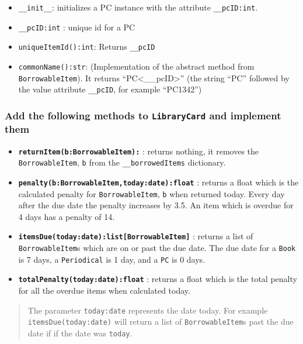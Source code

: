 \begin{itemize}
  \begin{itemize}
  \tightlist
  \item
    \texttt{\_\_init\_\_}: initializes a PC instance with the attribute
    \texttt{\_\_pcID:int}.
  \item
    \texttt{\_\_pcID:int} : unique id for a PC
  \item
    \texttt{uniqueItemId():int}: Returns \texttt{\_\_pcID}
  \item
    \texttt{commonName():str}: (Implementation of the abstract method
    from \texttt{BorrowableItem}). It returns
    ``PC\textless\_\_pcID\textgreater'' (the string ``PC'' followed by
    the value attribute \texttt{\_\_pcID}, for example ``PC1342'')
  \end{itemize}
\end{itemize}

\subsubsection{\texorpdfstring{Add the following methods to
\texttt{LibraryCard} and implement
them}{Add the following methods to LibraryCard and implement them}}\label{lab-exercise-6-borrowing-from-the-library.md__add-the-following-methods-to-librarycard-and-implement-them}

\begin{itemize}
\tightlist
\item
  \textbf{\texttt{returnItem(b:BorrowableItem):}} : returns nothing, it
  removes the \texttt{BorrowableItem}, \texttt{b} from the
  \texttt{\_\_borrowedItems} dictionary.
\item
  \textbf{\texttt{penalty(b:BorrowableItem,today:date):float}} : returns
  a float which is the calculated penalty for \texttt{BorrowableItem},
  \texttt{b} when returned today. Every day after the due date the
  penalty increases by 3.5. An item which is overdue for 4 days has a
  penalty of 14.
\item
  \textbf{\texttt{itemsDue(today:date):list{[}BorrowableItem{]}}} :
  returns a list of \texttt{BorrowableItem}s which are on or past the
  due date. The due date for a \texttt{Book} is 7 days, a
  \texttt{Periodical} is 1 day, and a \texttt{PC} is 0 days.
\item
  \textbf{\texttt{totalPenalty(today:date):float}} : returns a float
  which is the total penalty for all the overdue items when calculated
  today.
\end{itemize}

\begin{quote}
The parameter \texttt{today:date} represents the date today. For example
\texttt{itemsDue(today:date)} will return a list of
\texttt{BorrowableItem}s past the due date if if the date was
\texttt{today}.
\end{quote}

